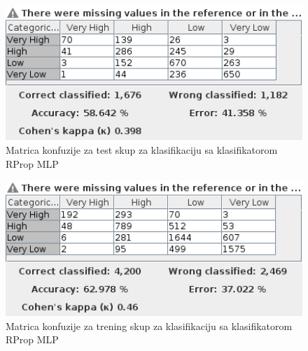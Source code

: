\documentclass[11pt]{article} %
\begin{document}
\newline
\begin{figure}[h!]
	\centering
	\includegraphics[width=1.1\textwidth]{priceClassificationTest/RProp}
	\caption{Matrica konfuzije za test skup za klasifikaciju sa klasifikatorom RProp MLP}
\end{figure}
\begin{figure}[h!]
	\centering
	\includegraphics[width=1.1\textwidth]{priceClassificationTraining/RProp}
	\caption{Matrica konfuzije za trening skup za klasifikaciju sa klasifikatorom RProp MLP}
\end{figure}
\end{document}
